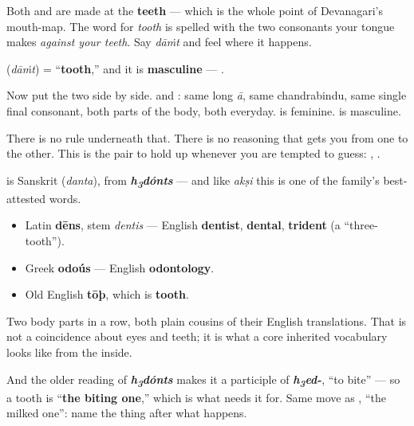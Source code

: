 Both \textbf{} and \textbf{} are made at the \textbf{teeth} — which is the whole point of Devanagari's mouth-map. The word for \emph{tooth} is spelled with the two consonants your tongue makes \emph{against your teeth}. Say \emph{dāṁt} and feel where it happens.

\begin{grammarlens}[title={Grammar Lens: the trap}]
\textbf{} (\emph{dāṁt}) = \textquotedblleft{}\textbf{tooth},\textquotedblright{} and it is \textbf{masculine} — \textbf{ }.

Now put the two side by side. \textbf{} and \textbf{}: same long \emph{ā}, same chandrabindu, same single final consonant, both parts of the body, both everyday. \textbf{} is feminine. \textbf{} is masculine.

There is no rule underneath that. There is no reasoning that gets you from one to the other. This is the pair to hold up whenever you are tempted to guess: \textbf{ }, \textbf{ }.
\end{grammarlens}

\begin{cousinweb}
\textbf{} is Sanskrit \textbf{} (\emph{danta}), from \emph{\textbf{h\textsubscript{3}dónts}} — and like \emph{akṣi} this is one of the family's best-attested words.

\begin{itemize}
\raggedright
  \item Latin \textbf{dēns}, stem \emph{dentis} — English \textbf{dentist}, \textbf{dental}, \textbf{trident} (a \textquotedblleft{}three-tooth\textquotedblright{}).
  \item Greek \textbf{odoús} — English \textbf{odontology}.
  \item Old English \textbf{tōþ}, which is \textbf{tooth}.
\end{itemize}

Two body parts in a row, both plain cousins of their English translations. That is not a coincidence about eyes and teeth; it is what a core inherited vocabulary looks like from the inside.

And the older reading of \emph{\textbf{h\textsubscript{3}dónts}} makes it a participle of \emph{\textbf{h\textsubscript{3}ed-}}, \textquotedblleft{}to bite\textquotedblright{} — so a tooth is \textquotedblleft{}\textbf{the biting one},\textquotedblright{} which is what \textbf{} needs it for. Same move as \textbf{}, \textquotedblleft{}the milked one\textquotedblright{}: name the thing after what happens.
\end{cousinweb}

